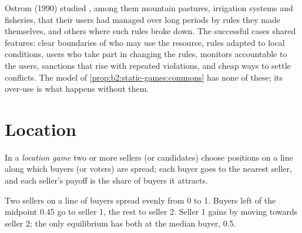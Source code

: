 \begin{record}
Ostrom (1990) studied , among them mountain pastures, irrigation systems and
fisheries, that their users had managed over long periods by rules they made themselves, and others where
such rules broke down. The successful cases shared features: clear boundaries of who may use the resource,
rules adapted to local conditions, users who take part in changing the rules, monitors accountable to the
users, sanctions that rise with repeated violations, and cheap ways to settle conflicts. The model of
\cref{prop:b2:static-games:commons} has none of these; its over-use is what happens without them.
\end{record}

\section{Location}\label{sec:b2:static-games:location}

\begin{definition}\label{def:b2:static-games:location-game}
In a \emph{location game} two or more sellers (or candidates) choose positions on a line
along which buyers (or voters) are spread; each buyer goes to the nearest seller, and each seller's payoff is
the share of buyers it attracts.
\end{definition}

\begin{omfigure}

{\small Two sellers on a line of buyers spread evenly from 0 to 1. Buyers left of the midpoint 0.45 go to seller
1, the rest to seller 2. Seller 1 gains by moving towards seller 2; the only equilibrium has both at the median
buyer, 0.5.}
\end{omfigure}

